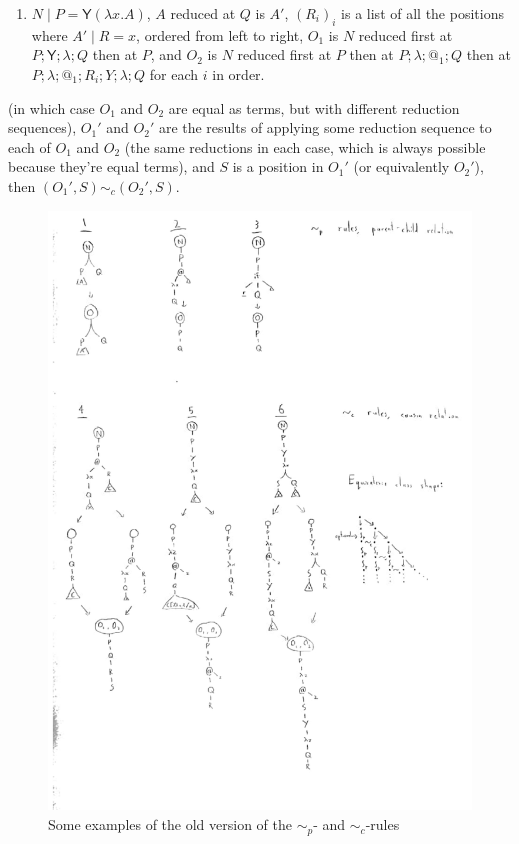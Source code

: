 \documentclass{article}
\newcommand{\tY}{\textsf{Y}}
\theoremstyle{definition}
\theoremstyle{lemma}
\theoremstyle{remark}
\begin{document}
\begin{enumerate}
\begin{enumerate}
        \item $N \mid P = \tY (\lambda x. A)$, $A$ reduced at $Q$ is $A'$, $(R_i)_i$ is a list of all the positions where $A' \mid R  = x$, ordered from left to right, $O_1$ is $N$ reduced first at $P;\tY;\lambda;Q$ then at $P$, and $O_2$ is $N$ reduced first at $P$ then at $P;\lambda;@_1;Q$ then at $P;\lambda;@_1;R_i;Y;\lambda;Q$ for each $i$ in order.
    \end{enumerate}
    (in which case $O_1$ and $O_2$ are equal as terms, but with different reduction sequences), $O_1'$ and $O_2'$ are the results of applying some reduction sequence to each of $O_1$ and $O_2$ (the same reductions in each case, which is always possible because they're equal terms), and $S$ is a position in $O_1'$ (or equivalently $O_2'$), then $(O_1',S) \sim_c (O_2',S)$.
\end{enumerate}

\begin{figure}
\includegraphics[height=0.9\textheight]{akr-diagram.pdf}
\caption{\label{fig:adk-diagram} Some examples of the old version of the $\sim_p$- and $\sim_c$-rules}
\end{figure}
\end{document}
